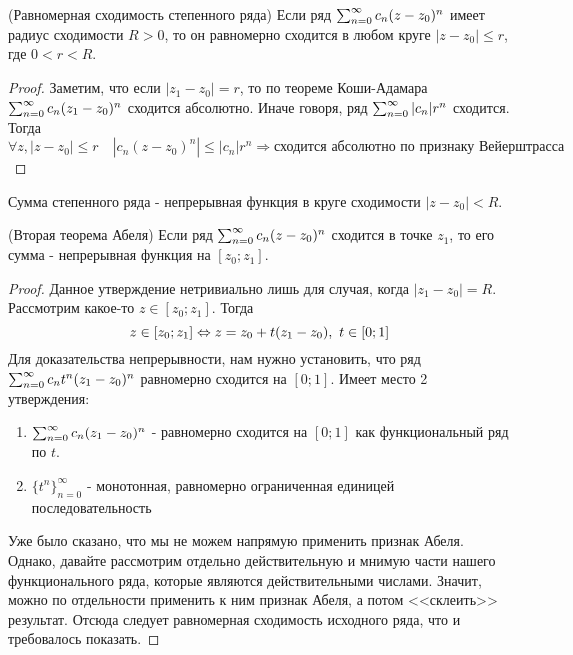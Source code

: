 \begin{theorem} (Равномерная сходимость степенного ряда)
	Если ряд $\sum_{n = 0}^\infty c_n(z - z_0)^n$ имеет радиус сходимости $R > 0$, то он равномерно сходится в любом круге $|z - z_0| \le r$, где $0 < r < R$.
\end{theorem}

\begin{proof}
	Заметим, что если $|z_1 - z_0| = r$, то по теореме Коши-Адамара $\sum_{n = 0}^\infty c_n(z_1 - z_0)^n$ сходится абсолютно. Иначе говоря, ряд $\sum_{n = 0}^\infty |c_n|r^n$ сходится. Тогда
	\[
		\forall z, |z - z_0| \le r \quad |c_n(z - z_0)^n| \le |c_n|r^n \Longrightarrow \text{сходится абсолютно по признаку Вейерштрасса}
	\]
\end{proof}

\begin{corollary}
	Сумма степенного ряда - непрерывная функция в круге сходимости $|z - z_0| < R$.
\end{corollary}

\begin{theorem} (Вторая теорема Абеля)
	Если ряд $\sum_{n = 0}^\infty c_n(z - z_0)^n$ сходится в точке $z_1$, то его сумма - непрерывная функция на $[z_0; z_1]$.
\end{theorem}

\begin{proof}
	Данное утверждение нетривиально лишь для случая, когда $|z_1 - z_0| = R$. Рассмотрим какое-то $z \in [z_0; z_1]$. Тогда
	\[
		z \in [z_0; z_1] \Leftrightarrow z = z_0 + t(z_1 - z_0),\ t \in [0; 1]
	\]
	Для доказательства непрерывности, нам нужно установить, что ряд $\sum_{n = 0}^\infty c_n t^n(z_1 - z_0)^n$ равномерно сходится на $[0; 1]$. Имеет место 2 утверждения:
	\begin{enumerate}
		\item $\sum_{n = 0}^\infty c_n(z_1 - z_0)^n$ - равномерно сходится на $[0; 1]$ как функциональный ряд по $t$.
		
		\item $\{t^n\}_{n = 0}^\infty$ - монотонная, равномерно ограниченная единицей последовательность
	\end{enumerate}
	Уже было сказано, что мы не можем напрямую применить признак Абеля. Однако, давайте рассмотрим отдельно действительную и мнимую части нашего функционального ряда, которые являются действительными числами. Значит, можно по отдельности применить к ним признак Абеля, а потом <<склеить>> результат. Отсюда следует равномерная сходимость исходного ряда, что и требовалось показать.
\end{proof}

